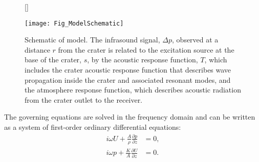 \documentclass[10pt]{article}
\begin{document}
\begin{figure}[t!]
\centering
{}[\FBwidth]
{\caption{Schematic of model. The infrasound signal, $\Delta p$, observed at a distance $r$ from the crater is related to the excitation source  at the base of the crater, $s$, by the acoustic response function, $T$, which includes the crater acoustic response function that describes wave propagation inside the crater and associated resonant modes, and  the atmosphere response function, which describes acoustic radiation from the crater outlet to the receiver.}
\label{fig:charlesX}}
{\texttt{[image: Fig\_ModelSchematic]}}
\end{figure}

The governing equations are solved in the frequency domain and can be written as a system of first-order ordinary differential equations:
\begin{align}
i \omega U + \frac{A}{\rho} \frac{\partial p}{\partial z} & = 0, 
\label{eq:govern eq 1} \\
i \omega p + \frac{K}{A} \frac{\partial U}{\partial z} & = 0.
\label{eq:govern eq 2}
\end{align}
\end{document}
